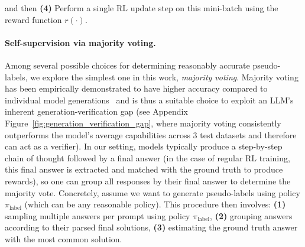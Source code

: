and then \textbf{(4)} Perform a single RL update step on this mini-batch using the  reward function $r(\cdot)$.


\paragraph{Self-supervision via majority voting.}
Among several possible choices for determining reasonably accurate pseudo-labels, we explore the simplest one in this work, \emph{majority voting}. Majority voting has been empirically demonstrated to have higher accuracy compared to individual model generations~\citep{wang2023selfconsistency} and is thus a suitable choice to exploit an LLM's inherent generation-verification gap (see Appendix Figure~\ref{fig:generation_verification_gap}, where majority voting consistently outperforms the model's average capabilities across 3 test datasets and therefore can act as a verifier). 
In our setting, models typically produce a step-by-step chain of thought followed by a final answer (in the case of regular RL training, this final answer is extracted and matched with the ground truth to produce rewards), so one can group all responses by their final answer to determine the majority vote. Concretely, assume we want to generate pseudo-labels using policy $\pi_\text{label}$ (which can be any reasonable policy). This procedure then involves: \textbf{(1)} sampling multiple answers per prompt using policy $\pi_\text{label}$, \textbf{(2)} grouping answers according to their parsed final solutions, \textbf{(3)} estimating the ground truth answer with the most common solution.


